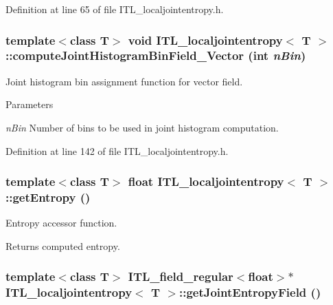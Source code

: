 Definition at line 65 of file ITL\_\-localjointentropy.h.

\hypertarget{classITL__localjointentropy_aea0240252de7ae30bf4835451421f689}{
\subsubsection[{computeJointHistogramBinField\_\-Vector}]{\setlength{\rightskip}{0pt plus 5cm}template$<$class T$>$ void {\bf ITL\_\-localjointentropy}$<$ T $>$::computeJointHistogramBinField\_\-Vector (int {\em nBin})}}
\label{classITL__localjointentropy_aea0240252de7ae30bf4835451421f689}


Joint histogram bin assignment function for vector field. 


\begin{DoxyParams}{Parameters}
\item[{\em nBin}]Number of bins to be used in joint histogram computation. \end{DoxyParams}


Definition at line 142 of file ITL\_\-localjointentropy.h.

\hypertarget{classITL__localjointentropy_a340a81aab892167d4e1237a2c8dc32f4}{
\subsubsection[{getEntropy}]{\setlength{\rightskip}{0pt plus 5cm}template$<$class T$>$ float {\bf ITL\_\-localjointentropy}$<$ T $>$::getEntropy ()}}
\label{classITL__localjointentropy_a340a81aab892167d4e1237a2c8dc32f4}


Entropy accessor function. 

\begin{DoxyReturn}{Returns}
computed entropy. 
\end{DoxyReturn}
\hypertarget{classITL__localjointentropy_a6692663398468a38585e53b005fef179}{
\subsubsection[{getJointEntropyField}]{\setlength{\rightskip}{0pt plus 5cm}template$<$class T$>$ {\bf ITL\_\-field\_\-regular}$<$float$>$$\ast$ {\bf ITL\_\-localjointentropy}$<$ T $>$::getJointEntropyField ()}}
\label{classITL__localjointentropy_a6692663398468a38585e53b005fef179}


